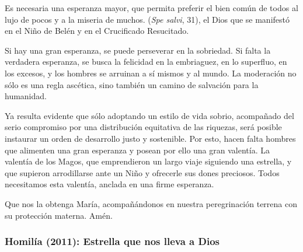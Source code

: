 \begin{body}
					Es necesaria una esperanza mayor, que permita preferir el bien común de todos al lujo de pocos y a la miseria de muchos.  (\emph{Spe salvi}, 31), el Dios que se manifestó en el Niño de Belén y en el Crucificado Resucitado.
					
					Si hay una gran esperanza, se puede perseverar en la sobriedad. Si falta la verdadera esperanza, se busca la felicidad en la embriaguez, en lo superfluo, en los excesos, y los hombres se arruinan a sí mismos y al mundo. La moderación no sólo es una regla ascética, sino también un camino de salvación para la humanidad.
					
					Ya resulta evidente que sólo adoptando un estilo de vida sobrio, acompañado del serio compromiso por una distribución equitativa de las riquezas, será posible instaurar un orden de desarrollo justo y sostenible. Por esto, hacen falta hombres que alimenten una gran esperanza y posean por ello una gran valentía. La valentía de los Magos, que emprendieron un largo viaje siguiendo una estrella, y que supieron arrodillarse ante un Niño y ofrecerle sus dones preciosos. Todos necesitamos esta valentía, anclada en una firme esperanza.
					
					Que nos la obtenga María, acompañándonos en nuestra peregrinación terrena con su protección materna. Amén.
				\end{body}
			
			
			\subsubsection{Homilía (2011): Estrella que nos lleva a Dios}
			
				
